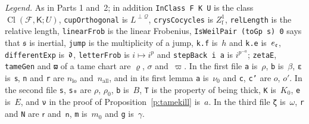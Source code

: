 \documentclass[11pt,a4paper]{article}
\newcommand{\m}[1]{\mbox{$#1$}}        %
\theoremstyle{plainx}
\theoremstyle{uprightx}
\providecommand{\InCl}[3]{\operatorname{Cl}(#1,#2;#3)}
\providecommand{\cupOrth}[2]{{#2}^{\perp#1}}
\begin{document}
\emph{Legend.} As in Parts 1 and~2; in addition \texttt{InClass F K U} is the class
$\InCl{\mathcal{F}}{\mathsf{K}}{U}$, \texttt{cupOrthogonal} is $\cupOrth{\mathcal{Q}}{L}$,
\texttt{crysCocycles} is \m{Z^{1}_{\mathrm{f}}}, \texttt{relLength} is the relative length,
\texttt{linearFrob} is the linear Frobenius, \texttt{IsWeilPair (toGp s) 0} says that $\mathfrak{s}$ is inertial,
\texttt{jump} is the multiplicity of a jump, \texttt{k.f} is~$h$ and \texttt{k.e} is~$e_{\mathfrak{c}}$,
\texttt{differentExp} is~$\mathfrak{d}$, \texttt{letterFrob} is \m{i\mapsto i^{p}} and \texttt{stepBack i a} is
\m{i^{p^{-a}}}; \texttt{zetaE}, \texttt{tameGen} and \texttt{ϖ} of a tame chart are $\varrho$, $\sigma$
and~$\varpi$. In the first file \texttt{a} is~$\rho$, \texttt{b} is~$\beta$, \texttt{ε} is~$\mathsf{s}$,
\texttt{n} and \texttt{r} are $n_{\mathrm{lo}}$ and~$n_{\mathrm{all}}$, and in its first lemma \texttt{a}
is~$\nu_0$ and \texttt{c}, \texttt{c'} are $o$, $o'$. In the second file \texttt{s}, \texttt{s₀} are $\rho$,
$\rho_0$, \texttt{b} is~$B$, \texttt{T} is the property of being thick, \texttt{K} is~$K_0$, \texttt{e} is~$E$,
and \texttt{ν} in the proof of Proposition~\ref{p:tamekill} is~$a$. In the third file \texttt{ζ}
is~$\omega$, \texttt{r} and \texttt{N} are $\mathsf{r}$ and~$\mathsf{n}$, \texttt{m} is~$m_0$ and \texttt{g}
is~$\gamma$.
\end{document}
